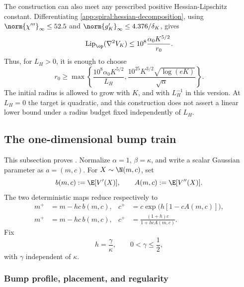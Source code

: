 The construction can also meet any prescribed positive Hessian-Lipschitz
constant.  Differentiating
\eqref{app:spiral:hessian-decomposition}, using
\(\norm{\chi'''}_\infty\leq52.5\) and
\(\norm{g_K'}_\infty\leq4.376/\delta_K\), gives
\begin{equation}
\label{app:spiral:global-hessian-lipschitz}
    \operatorname{Lip}_{\op}(\nabla^2V_K)
    \leq10^8\frac{\alpha_0K^{5/2}}{r_0}.
\end{equation}
Thus, for \(L_H>0\), it is enough to choose
\[
    r_0\geq
    \max\left\{
        \frac{10^8\alpha_0K^{5/2}}{L_H},
        \frac{10^{25}K^{3/2}\sqrt{\log(eK)}}{\sqrt\alpha}
    \right\}.
\]
The initial radius is allowed to grow with \(K\), and with \(L_H^{-1}\)
in this version.  At \(L_H=0\) the target is quadratic, and this
construction does not assert a linear lower bound under a radius budget
fixed independently of \(L_H\).

\subsection{The one-dimensional bump train}
\label{app:bump}

This subsection proves .  Normalize
\(\alpha=1\), \(\beta=\kappa\), and write a scalar Gaussian parameter as
\(a=(m,c)\).  For \(X\sim\N(m,c)\), set
\begin{equation}
\label{app:bump:averaged-score-curvature}
    b(m,c):=\E[V'(X)],
    \qquad
    A(m,c):=\E[V''(X)].
\end{equation}
The two deterministic maps reduce respectively to
\begin{align}
\label{app:bump:riemannian-map}
    m^+&=m-hc\,b(m,c),
    &
    c^+&=c\exp\bigl(h[1-cA(m,c)]\bigr),\\
\label{app:bump:kl-map}
    m^+&=m-hc\,b(m,c),
    &
    c^+&=\frac{(1+h)c}{1+hcA(m,c)}.
\end{align}
Fix
\begin{equation}
\label{app:bump:stepsize}
    h=\frac\gamma\kappa,
    \qquad
    0<\gamma\leq\frac12,
\end{equation}
with \(\gamma\) independent of \(\kappa\).

\subsubsection{Bump profile, placement, and regularity}

